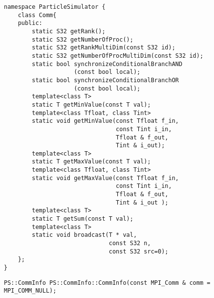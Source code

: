 \begin{lstlisting}[caption=Communication]
namespace ParticleSimulator {
    class Comm{
    public:
        static S32 getRank();
        static S32 getNumberOfProc();
        static S32 getRankMultiDim(const S32 id);
        static S32 getNumberOfProcMultiDim(const S32 id);
        static bool synchronizeConditionalBranchAND
                    (const bool local);
        static bool synchronizeConditionalBranchOR
                    (const bool local);
        template<class T>
        static T getMinValue(const T val);
        template<class Tfloat, class Tint>
        static void getMinValue(const Tfloat f_in,
                                const Tint i_in,
                                Tfloat & f_out,
                                Tint & i_out);
        template<class T>
        static T getMaxValue(const T val);
        template<class Tfloat, class Tint>
        static void getMaxValue(const Tfloat f_in,
                                const Tint i_in,
                                Tfloat & f_out,
                                Tint & i_out );
        template<class T>
        static T getSum(const T val);
        template<class T>
        static void broadcast(T * val,
                              const S32 n,
                              const S32 src=0);
    };
}
\end{lstlisting}



\begin{screen}
\begin{verbatim}
PS::CommInfo PS::CommInfo::CommInfo(const MPI_Comm & comm = MPI_COMM_NULL);
\end{verbatim}
\end{screen}

